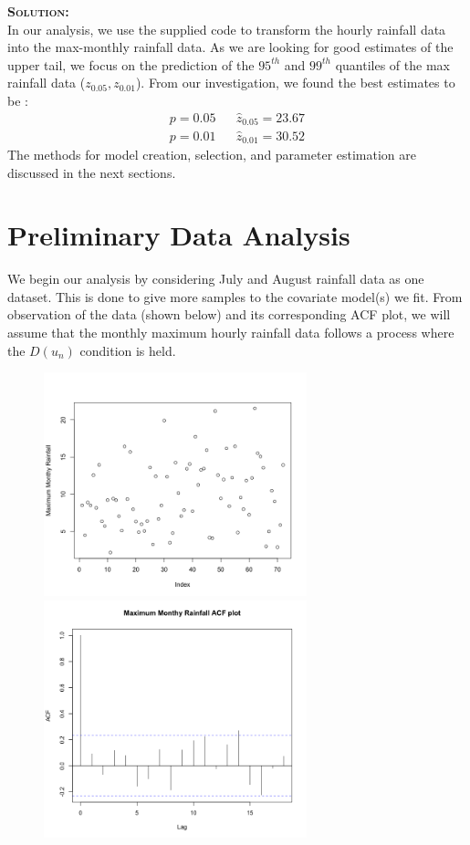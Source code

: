 \documentclass[12pt,oneside]{article}
\newenvironment{solution}
    {\textbf{\textsc{Solution:}}\\}
    {\newpage}
\begin{document}
\begin{solution}
In our analysis, we use the supplied code to transform the hourly rainfall data into the max-monthly rainfall data. As we are looking for good estimates of the upper tail, we focus on the prediction of the $95^{th}$ and $99^{th}$ quantiles of the max rainfall data ($z_{0.05},z_{0.01}$). From our investigation, we found the best estimates to be :
\begin{align*}
    p= 0.05  && \hat{z}_{0.05}=23.67 \\
    p= 0.01  && \hat{z}_{0.01}=30.52 
\end{align*}
The methods for model creation, selection, and parameter estimation are discussed in the next sections.
\section*{Preliminary Data Analysis}
We begin our analysis by considering July and August rainfall data as one dataset. This is done to give more samples to the covariate model(s) we fit. From observation of the data (shown below) and its corresponding ACF plot, we will assume that the monthly maximum hourly rainfall data follows a process where the $D(u_n)$ condition is held. 
\begin{figure}[H]
\begin{center}
{\includegraphics[width=3in]{Assignments/a3/rain.png}}
{\includegraphics[width=3in]{Assignments/a3/rain-acf.png}}

\end{center}
\end{figure}
\end{solution}
\end{document}
